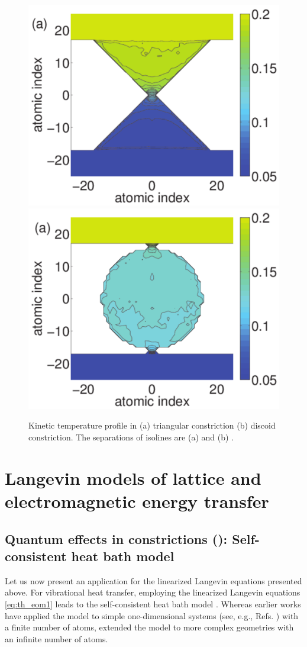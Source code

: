 \begin{figure}
\begin{center}
 \includegraphics[width=.49\columnwidth]{pics/aip_fig5a.pdf}
 \includegraphics[width=.49\columnwidth]{pics/aip_fig6a.pdf}
 \caption{Kinetic temperature profile in (a) triangular constriction (b) discoid constriction. The separations of isolines are (a) and (b) .}
\label{fig:aip_figs56}
\end{center}
\end{figure}

\section{Langevin models of lattice and electromagnetic energy transfer}

\subsection{Quantum effects in constrictions (): Self-consistent heat bath model}

\label{sec:results_schb}
Let us now present an application for the linearized Langevin equations presented above. For vibrational heat transfer, employing the linearized Langevin equations \eqref{eq:th_eom1} leads to the self-consistent heat bath model \cite{bolsterli70}. Whereas earlier works have applied the model to simple one-dimensional systems (see, e.g., Refs. \cite{bolsterli70,visscher75,dhar03,dhar06,segal09,bandyopadhyay11}) with a finite number of atoms,  extended the model to more complex geometries with an infinite number of atoms.  %

